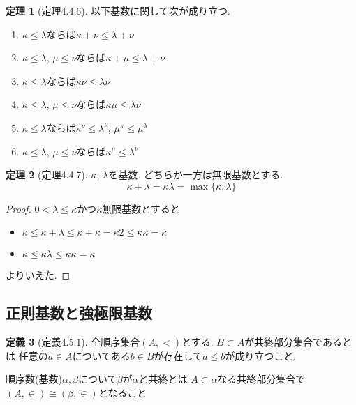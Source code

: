 \documentclass[dvipdfmx,a4paper,11pt]{article}
\theoremstyle{definition}
\newtheorem{thm}{定理}
\newtheorem{dfn}[thm]{定義}
\begin{document}
 \begin{tcolorbox}
 [colback = white, colframe = green!35!black, fonttitle = \bfseries,breakable = true]
\begin{thm}[定理4.4.6]
以下基数に関して次が成り立つ. 
\begin{enumerate}
\item $\kappa \le \lambda$ならば$\kappa +\nu\le \lambda+\nu$
\item $\kappa \le \lambda$, $\mu \le \nu $ならば$\kappa +\mu \le \lambda+\nu$
\item $\kappa \le \lambda$ならば$\kappa \nu\le \lambda\nu$
\item $\kappa \le \lambda$, $\mu \le \nu $ならば$\kappa \mu \le \lambda\nu$
\item $\kappa \le \lambda$ならば$\kappa^\nu\le \lambda^\nu$, $\mu^\kappa \le \mu^\lambda$
\item $\kappa \le \lambda$, $\mu \le \nu $ならば$\kappa^\mu \le \lambda^\nu$
\end{enumerate}
\end{thm}
\end{tcolorbox}

 \begin{tcolorbox}
 [colback = white, colframe = green!35!black, fonttitle = \bfseries,breakable = true]
\begin{thm}[定理4.4.7]
$\kappa$, $\lambda$を基数.
どちらか一方は無限基数とする. 
$$
\kappa + \lambda
=
\kappa \lambda
=
\max\{ \kappa , \lambda\}
$$
\end{thm}
\end{tcolorbox}
\begin{proof}
$0 < \lambda\le\kappa$かつ$\kappa$無限基数とすると
\begin{itemize}
\item $\kappa \le \kappa + \lambda \le \kappa+\kappa = \kappa2 \le \kappa\kappa=\kappa$
\item $\kappa \le \kappa\lambda \le\kappa\kappa=\kappa$
\end{itemize}
よりいえた. 
\end{proof}

\subsection{正則基数と強極限基数}
 \begin{tcolorbox}
 [colback = white, colframe = green!35!black, fonttitle = \bfseries,breakable = true]
\begin{dfn}[定義4.5.1]
全順序集合$(A,<)$とする. $B \subset A$が共終部分集合であるとは
任意の$a \in A$についてある$b \in B$が存在して$a\le b$が成り立つこと.

順序数(基数)$\alpha, \beta$について$\beta$が$\alpha$と共終とは
$A \subset \alpha$なる共終部分集合で$(A, \in) \cong (\beta, \in)$となること
\end{dfn}
\end{tcolorbox}
\end{document}
